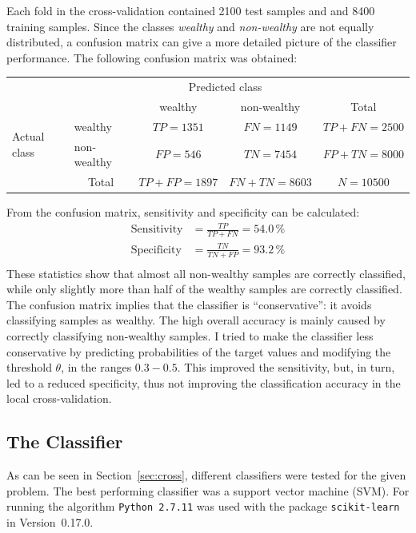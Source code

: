 \documentclass[a4paper]{article}
\begin{document}
Each fold in the cross-validation contained 2100 test samples and and
8400 training samples. Since the classes \emph{wealthy} and
\emph{non-wealthy} are not equally distributed, a confusion matrix can
give a more detailed picture of the classifier performance. The
following confusion matrix was obtained:

\begin{table}[h]
\centering
\begin{tabular}{l|l|c|c|c}
\multicolumn{2}{c}{}&\multicolumn{2}{c}{Predicted class}&\\
\cline{3-4}
\multicolumn{2}{c|}{}&wealthy & non-wealthy &\multicolumn{1}{c}{Total}\\
\cline{2-4}
\multirow{2}{*}{Actual class}& wealthy & $TP = 1351$ & $FN = 1149$ & $TP+FN = 2500$\\
\cline{2-4}
& non-wealthy & $FP = 546$ & $TN = 7454$ & $FP+TN = 8000$\\
\cline{2-4}
\multicolumn{1}{c}{} & \multicolumn{1}{c}{Total} & \multicolumn{1}{c}{$TP+FP=1897$} & \multicolumn{1}{c}{$FN+TN = 8603$} & \multicolumn{1}{c}{$N = 10500$}\\
\end{tabular}
\end{table}
From the confusion matrix, sensitivity and specificity can be calculated:
\begin{align}
\text{Sensitivity} &= \frac{TP}{TP + FN} = 54.0\,\%\\
\text{Specificity}    &= \frac{TN}{TN + FP} = 93.2\,\%\\
\end{align}
These statistics show that almost all non-wealthy samples are
correctly classified, while only slightly more than half of the
wealthy samples are correctly classified. The confusion matrix implies
that the classifier is ``conservative'': it avoids classifying samples
as wealthy. The high overall accuracy is mainly caused by correctly
classifying non-wealthy samples. I tried to make the classifier less
conservative by predicting probabilities of the target values and
modifying the threshold $\theta$, in the ranges $0.3 - 0.5$. This
improved the sensitivity, but, in turn, led to a reduced specificity,
thus not improving the classification accuracy in the local
cross-validation.

\subsection{The Classifier}

As can be seen in Section~\ref{sec:cross}, different classifiers were
tested for the given problem. The best performing classifier was a support
vector machine (SVM). For running the algorithm \texttt{Python~2.7.11}
was used with the package \texttt{scikit-learn} in Version~0.17.0.
\end{document}
